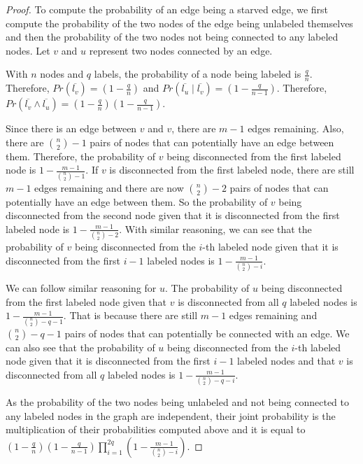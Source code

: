 \documentclass{article}
\newtheorem{proof}{Proof}
\begin{document}
\begin{proof}
To compute the probability of an edge being a starved edge, we first compute the probability of the two nodes of the edge being unlabeled themselves and then the probability of the two nodes not being connected to any labeled nodes. Let $v$ and $u$ represent two nodes connected by an edge.

With $n$ nodes and $q$ labels, the probability of a node being labeled is $\frac{q}{n}$. Therefore, $Pr(\overline{l_v})=(1 - \frac{q}{n})$ and $Pr(\overline{l_u} \mid \overline{l_v})=(1 - \frac{q}{n-1})$. Therefore, $Pr(\overline{l_v}\wedge\overline{l_u})=(1 - \frac{q}{n})(1 - \frac{q}{n-1})$. 

Since there is an edge between $v$ and $v$, there are $m-1$ edges remaining. Also, there are ${n \choose 2} - 1$ pairs of nodes that can potentially have an edge between them. Therefore, the probability of $v$ being disconnected from the first labeled node is $1-\frac{m-1}{{n \choose 2}-1}$. If $v$ is disconnected from the first labeled node, there are still $m-1$ edges remaining and there are now ${n \choose 2} - 2$ pairs of nodes that can potentially have an edge between them. So the probability of $v$ being disconnected from the second node given that it is disconnected from the first labeled node is $1-\frac{m-1}{{n \choose 2}-2}$. With similar reasoning, we can see that the probability of $v$ being disconnected from the $i$-th labeled node given that it is disconnected from the first $i-1$ labeled nodes is $1-\frac{m-1}{{n \choose 2}-i}$.

We can follow similar reasoning for $u$. The probability of $u$ being disconnected from the first labeled node given that $v$ is disconnected from all $q$ labeled nodes is $1-\frac{m-1}{{n \choose 2}-q-1}$. That is because there are still $m-1$ edges remaining and ${n \choose 2}-q-1$ pairs of nodes that can potentially be connected with an edge. We can also see that the probability of $u$ being disconnected from the $i$-th labeled node given that it is disconnected from the first $i-1$ labeled nodes and that $v$ is disconnected from all $q$ labeled nodes is $1-\frac{m-1}{{n \choose 2}-q-i}$.


As the probability of the two nodes being unlabeled and not being connected to any labeled nodes in the graph are independent, their joint probability is the multiplication of their probabilities computed above and it is equal to $(1 - \frac{q}{n})(1 - \frac{q}{n-1})\prod_{i=1}^{2q}(1 - \frac{m-1}{{n \choose 2}-i})$.
\end{proof}
\end{document}
